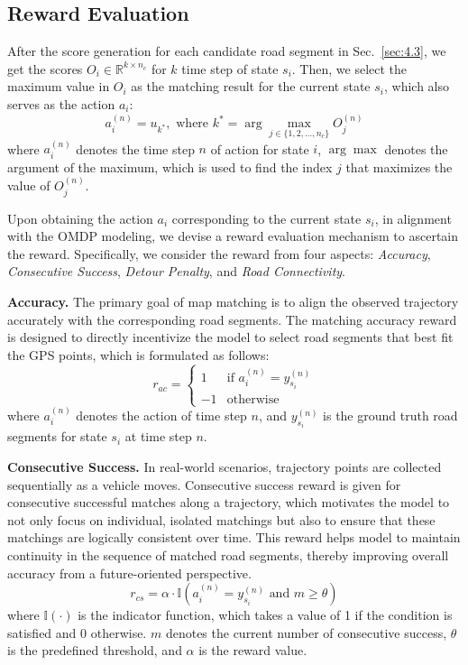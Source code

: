 \subsection{Reward Evaluation}
\label{sec:5.2}
After the score generation for each candidate road segment in Sec.~\ref{sec:4.3}, we get the scores $O_i \in \mathbb{R}^{k \times n_c}$ for $k$ time step of state $s_i$. Then, we select the maximum value in $O_i$ as the matching result for the current state $s_i$, which also serves as the action $a_i$:
\begin{equation}
    a_i^{(n)} = u_{k^*}, \text{ where } k^* = \arg \max_{j \in \{1, 2, \ldots, n_c\}} O_j^{(n)}
\end{equation}
where $a_i^{(n)}$ denotes the time step $n$ of action for state $i$, $\arg \max$ denotes the argument of the maximum, which is used to find the index $j$ that maximizes the value of $O_j^{(n)}$.

Upon obtaining the action $a_i$ corresponding to the current state $s_i$, in alignment with the OMDP modeling, we devise a reward evaluation mechanism to ascertain the reward. Specifically, we consider the reward from four aspects: \textit{Accuracy}, \textit{Consecutive Success}, \textit{Detour Penalty}, and \textit{Road Connectivity}.

\textbf{Accuracy.} The primary goal of map matching is to align the observed trajectory accurately with the corresponding road segments. The matching accuracy reward is designed to directly incentivize the model to select road segments that best fit the GPS points, which is formulated as follows:
\begin{equation}
   r_{ac} = \begin{cases} 
    1 & \text{if } a_i^{(n)} = y_{s_i}^{(n)} \\
    -1 & \text{otherwise}
\end{cases}
\end{equation}
where $a_i^{(n)}$ denotes the action of time step $n$, and $y_{s_i}^{(n)}$ is the ground truth road segments for state $s_i$ at time step $n$.

\textbf{Consecutive Success.} In real-world scenarios, trajectory points are collected sequentially as a vehicle moves. Consecutive success reward is given for consecutive successful matches along a trajectory, which motivates the model to not only focus on individual, isolated matchings but also to ensure that these matchings are logically consistent over time. This reward helps model to maintain continuity in the sequence of matched road segments, thereby improving overall accuracy from a future-oriented perspective.
\begin{equation}
    r_{cs} = \alpha \cdot \mathbb{I}(a_i^{(n)}= y_{s_i}^{(n)} \text{ and } m \geq \theta)
\end{equation}
where $\mathbb{I}(\cdot)$ is the indicator function, which takes a value of 1 if the condition is satisfied and 0 otherwise. $m$ denotes the current number of consecutive success, $\theta$ is the predefined threshold, and $\alpha$ is the reward value.

